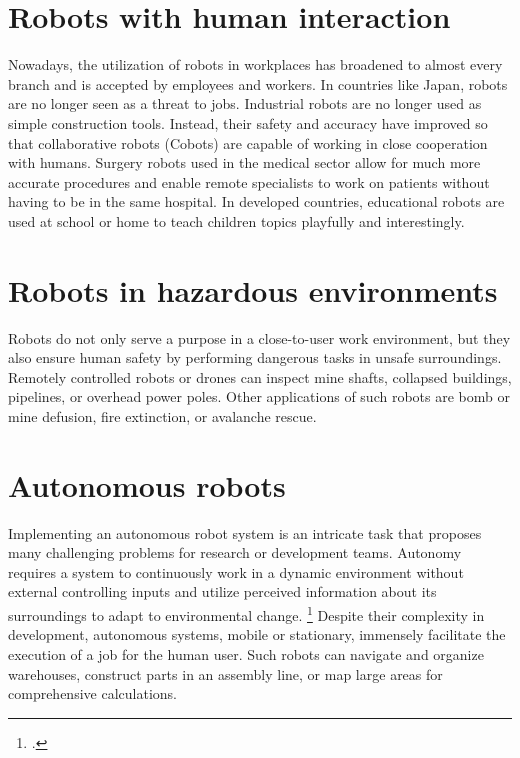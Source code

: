 \section{Robots with human interaction}
Nowadays, the utilization of robots in workplaces has broadened to almost every branch and is accepted by employees and workers. In countries like Japan, robots are no longer seen as a threat to jobs. 
Industrial robots are no longer used as simple construction tools. Instead, their safety and accuracy have improved so that collaborative robots (Cobots) are capable of working in close cooperation with humans. 
Surgery robots used in the medical sector allow for much more accurate procedures and enable remote specialists to work on patients without having to be in the same hospital. 
In developed countries, educational robots are used at school or home to teach children topics playfully and interestingly.

\section{Robots in hazardous environments}
Robots do not only serve a purpose in a close-to-user work environment, but they also ensure human safety by performing dangerous tasks in unsafe surroundings. 
Remotely controlled robots or drones can inspect mine shafts, collapsed buildings, pipelines, or overhead power poles.
Other applications of such robots are bomb or mine defusion, fire extinction, or avalanche rescue.

\section{Autonomous robots}
Implementing an autonomous robot system is an intricate task that proposes many challenging problems for research or development teams. Autonomy requires a system to continuously work in a dynamic environment without external controlling inputs and utilize perceived information about its surroundings to adapt to environmental change. \footcite[Pages 1-2]{bekey2005autonomous}
Despite their complexity in development, autonomous systems, mobile or stationary, immensely facilitate the execution of a job for the human user.
Such robots can navigate and organize warehouses, construct parts in an assembly line, or map large areas for comprehensive calculations.




